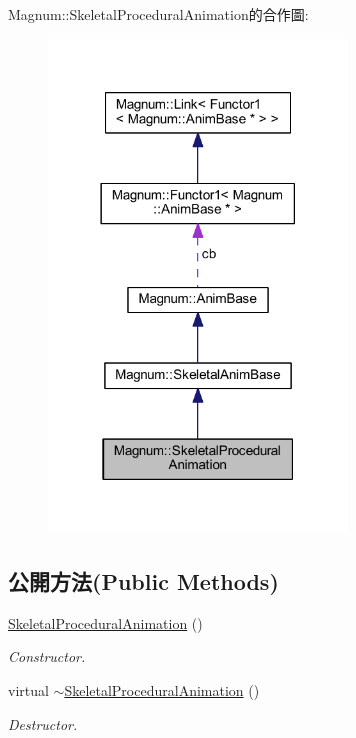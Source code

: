 Magnum\+:\+:Skeletal\+Procedural\+Animation的合作圖\+:\nopagebreak
\begin{figure}[H]
\begin{center}
\leavevmode
\includegraphics[width=225pt]{class_magnum_1_1_skeletal_procedural_animation__coll__graph}
\end{center}
\end{figure}
\subsection*{公開方法(Public Methods)}
\begin{DoxyCompactItemize}
\item 
\hyperlink{class_magnum_1_1_skeletal_procedural_animation_a0fdb0da584b8a3a7533753422f5c2b8c}{Skeletal\+Procedural\+Animation} ()\hypertarget{class_magnum_1_1_skeletal_procedural_animation_a0fdb0da584b8a3a7533753422f5c2b8c}{}\label{class_magnum_1_1_skeletal_procedural_animation_a0fdb0da584b8a3a7533753422f5c2b8c}

\begin{DoxyCompactList}\small\item\em Constructor. \end{DoxyCompactList}\item 
virtual \hyperlink{class_magnum_1_1_skeletal_procedural_animation_a6087d1a386b72cbddfb0ae81897e04d6}{$\sim$\+Skeletal\+Procedural\+Animation} ()\hypertarget{class_magnum_1_1_skeletal_procedural_animation_a6087d1a386b72cbddfb0ae81897e04d6}{}\label{class_magnum_1_1_skeletal_procedural_animation_a6087d1a386b72cbddfb0ae81897e04d6}

\begin{DoxyCompactList}\small\item\em Destructor. \end{DoxyCompactList}\end{DoxyCompactItemize}
